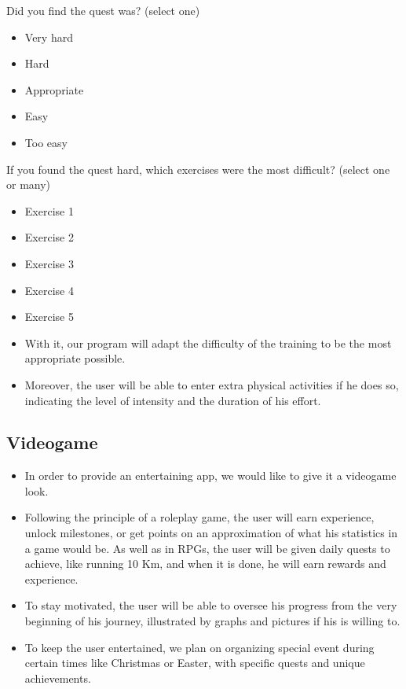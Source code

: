 \documentclass[conference]{IEEEtran}
\begin{document}
Did you find the quest was? (select one)
\begin{itemize}
\item Very hard
\item Hard
\item Appropriate
\item Easy
\item Too easy
\end{itemize}

If you found the quest hard, which exercises were the most difficult? (select one or many)
\begin{itemize}
\item Exercise 1
\item Exercise 2
\item Exercise 3
\item Exercise 4
\item Exercise 5
\end{itemize}

\begin{itemize}
\item With it, our program will adapt the difficulty of the training to be the most appropriate possible. 
\item Moreover, the user will be able to enter extra physical activities if he does so, indicating the level of intensity and the duration of his effort.
\end{itemize}

\subsection{Videogame}
\begin{itemize}
\item In order to provide an entertaining app, we would like to give it a videogame look. 
\item Following the principle of a roleplay game, the user will earn experience, unlock milestones, or get points on an approximation of what his statistics in a game would be. As well as in RPGs, the user will be given daily quests to achieve, like running 10 Km, and when it is done, he will earn rewards and experience. 
\item To stay motivated, the user will be able to oversee his progress from the very beginning of his journey, illustrated by graphs and pictures if his is willing to. 
\item To keep the user entertained, we plan on organizing special event during certain times like Christmas or Easter, with specific quests and unique achievements.
\end{itemize}
\end{document}

